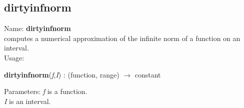 \subsection{ dirtyinfnorm }
\noindent Name: \textbf{dirtyinfnorm}\\
computes a numerical approximation of the infinite norm of a function on an interval.\\

\noindent Usage: 
\begin{center}
\textbf{dirtyinfnorm}(\emph{f},\emph{I}) : (\textsf{function}, \textsf{range}) $\rightarrow$ \textsf{constant}\\
\end{center}
Parameters: 
\emph{f} is a function.\\
\emph{I} is an interval.\\


